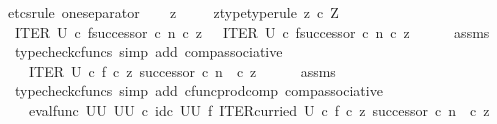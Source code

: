 \begin{isabellebody}
%
\isadelimproof
%
\endisadelimproof
%
\isatagproof
{}\isamarkupfalse%
{\isacharparenleft}{\kern0pt}etcs{\isacharunderscore}{\kern0pt}rule\ one{\isacharunderscore}{\kern0pt}separator{\isacharparenright}{\kern0pt}\isanewline
\ \ \isamarkupfalse%
\ z\ \isanewline
\ \ \isamarkupfalse%
\ z{\isacharunderscore}{\kern0pt}type{\isacharbrackleft}{\kern0pt}type{\isacharunderscore}{\kern0pt}rule{\isacharbrackright}{\kern0pt}{\isacharcolon}{\kern0pt}\ {\isachardoublequoteopen}z\ {\isasymin}\isactrlsub c\ Z{\isachardoublequoteclose}\isanewline
\ \ \isamarkupfalse%
\ {\isachardoublequoteopen}{\isacharparenleft}{\kern0pt}ITER\ U\ {\isasymcirc}\isactrlsub c\ {\isasymlangle}f{\isacharcomma}{\kern0pt}successor\ {\isasymcirc}\isactrlsub c\ n{\isasymrangle}{\isacharparenright}{\kern0pt}\ {\isasymcirc}\isactrlsub c\ z\ \ {\isacharequal}{\kern0pt}\ ITER\ U\ {\isasymcirc}\isactrlsub c\ {\isasymlangle}f{\isacharcomma}{\kern0pt}successor\ {\isasymcirc}\isactrlsub c\ n{\isasymrangle}\ {\isasymcirc}\isactrlsub c\ z{\isachardoublequoteclose}\isanewline
\ \ \ \ \isamarkupfalse%
\ assms\ \isamarkupfalse%
\ {\isacharparenleft}{\kern0pt}typecheck{\isacharunderscore}{\kern0pt}cfuncs{\isacharcomma}{\kern0pt}\ simp\ add{\isacharcolon}{\kern0pt}\ comp{\isacharunderscore}{\kern0pt}associative{}{\isacharparenright}{\kern0pt}\isanewline
\ \ \isamarkupfalse%
\ \isamarkupfalse%
\ {\isachardoublequoteopen}{\isachardot}{\kern0pt}{\isachardot}{\kern0pt}{\isachardot}{\kern0pt}\ {\isacharequal}{\kern0pt}\ ITER\ U\ {\isasymcirc}\isactrlsub c\ {\isasymlangle}f\ {\isasymcirc}\isactrlsub c\ z{\isacharcomma}{\kern0pt}\ successor\ {\isasymcirc}\isactrlsub c\ {\isacharparenleft}{\kern0pt}n\ \ {\isasymcirc}\isactrlsub c\ z{\isacharparenright}{\kern0pt}{\isasymrangle}{\isachardoublequoteclose}\isanewline
\ \ \ \ \isamarkupfalse%
\ assms\ \isamarkupfalse%
\ {\isacharparenleft}{\kern0pt}typecheck{\isacharunderscore}{\kern0pt}cfuncs{\isacharcomma}{\kern0pt}\ simp\ add{\isacharcolon}{\kern0pt}\ cfunc{\isacharunderscore}{\kern0pt}prod{\isacharunderscore}{\kern0pt}comp\ comp{\isacharunderscore}{\kern0pt}associative{}{\isacharparenright}{\kern0pt}\isanewline
\ \ \isamarkupfalse%
\ \isamarkupfalse%
\ {\isachardoublequoteopen}{\isachardot}{\kern0pt}{\isachardot}{\kern0pt}{\isachardot}{\kern0pt}\ {\isacharequal}{\kern0pt}\ {\isacharparenleft}{\kern0pt}eval{\isacharunderscore}{\kern0pt}func\ {\isacharparenleft}{\kern0pt}U\isactrlbsup U\isactrlesup {\isacharparenright}{\kern0pt}\ {\isacharparenleft}{\kern0pt}U\isactrlbsup U\isactrlesup {\isacharparenright}{\kern0pt}{\isacharparenright}{\kern0pt}\ {\isasymcirc}\isactrlsub c\ {\isacharparenleft}{\kern0pt}id\isactrlsub c\ {\isacharparenleft}{\kern0pt}U\isactrlbsup U\isactrlesup {\isacharparenright}{\kern0pt}\ {\isasymtimes}\isactrlsub f\ ITER{\isacharunderscore}{\kern0pt}curried\ U{\isacharparenright}{\kern0pt}\ {\isasymcirc}\isactrlsub c\ {\isasymlangle}f\ {\isasymcirc}\isactrlsub c\ z{\isacharcomma}{\kern0pt}\ successor\ {\isasymcirc}\isactrlsub c\ {\isacharparenleft}{\kern0pt}n\ \ {\isasymcirc}\isactrlsub c\ z{\isacharparenright}{\kern0pt}{\isasymrangle}{\isachardoublequoteclose}\isanewline

\end{isabellebody}

